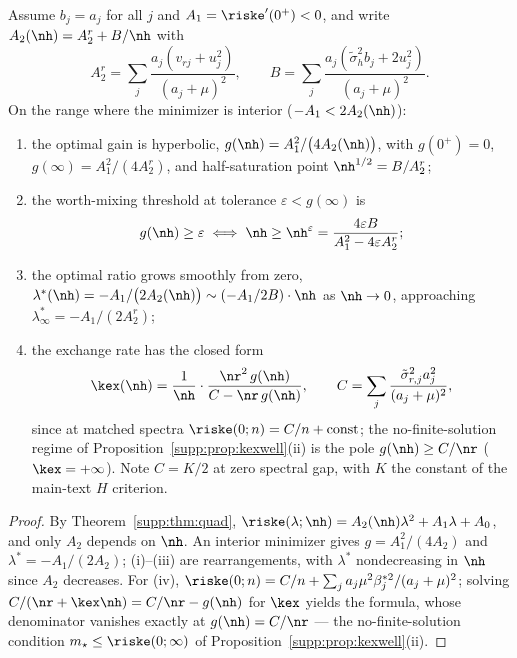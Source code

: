 \begin{theorem}\label{supp:thm:dosage}
Assume $b_j = a_j$ for all $j$ and $A_1 = \riske'(0^+) < 0$, and write $A_2(\nh) = A_2^r + B/\nh$ with
\begin{equation}
A_2^r = \sum_j \frac{a_j (v_{rj} + u_j^2)}{(a_j+\mu)^2},
\qquad
B = \sum_j \frac{a_j (\tilde\sigma_h^2 b_j + 2u_j^2)}{(a_j+\mu)^2}.
\end{equation}
On the range where the minimizer is interior ($-A_1 < 2A_2(\nh)$):
\begin{enumerate}
\item[(i)] the optimal gain is hyperbolic,
$g(\nh) = A_1^2 / \big(4A_2(\nh)\big)$, with $g(0^+) = 0$, $g(\infty) = A_1^2/(4A_2^r)$, and half-saturation point $\nh^{1/2} = B/A_2^r$;
\item[(ii)] the worth-mixing threshold at tolerance $\varepsilon < g(\infty)$ is
\begin{equation}
g(\nh) \ge \varepsilon \iff \nh \ge \nh^\varepsilon = \frac{4\varepsilon B}{A_1^2 - 4\varepsilon A_2^r};
\end{equation}
\item[(iii)] the optimal ratio grows smoothly from zero,
$\lambda^*(\nh) = -A_1/\big(2A_2(\nh)\big) \sim (-A_1/2B)\cdot\nh$ as $\nh \to 0$, approaching $\lambda^*_\infty = -A_1/(2A_2^r)$;
\item[(iv)] the exchange rate has the closed form
\begin{equation}
\kex(\nh) = \frac{1}{\nh}\cdot \frac{\nr^2\, g(\nh)}{C - \nr\, g(\nh)},
\qquad
C = \sum_j \frac{\tilde\sigma_{r,j}^2 a_j^2}{(a_j+\mu)^2},
\end{equation}
since at matched spectra $\riske(0; n) = C/n + \mathrm{const}$; the no-finite-solution regime of Proposition~\ref{supp:prop:kexwell}(ii) is the pole $g(\nh) \ge C/\nr$ ($\kex = +\infty$).
Note $C = K/2$ at zero spectral gap, with $K$ the constant of the main-text $H$ criterion.
\end{enumerate}
\end{theorem}

\begin{proof}
By Theorem~\ref{supp:thm:quad}, $\riske(\lambda; \nh) = A_2(\nh)\lambda^2 + A_1\lambda + A_0$, and only $A_2$ depends on $\nh$.
An interior minimizer gives $g = A_1^2/(4A_2)$ and $\lambda^* = -A_1/(2A_2)$; (i)--(iii) are rearrangements, with $\lambda^*$ nondecreasing in $\nh$ since $A_2$ decreases.
For (iv), $\riske(0; n) = C/n + \sum_j a_j \mu^2\beta_j^{*2}/(a_j+\mu)^2$; solving $C/(\nr + \kex\nh) = C/\nr - g(\nh)$ for $\kex$ yields the formula, whose denominator vanishes exactly at $g(\nh) = C/\nr$ --- the no-finite-solution condition $m_\star \le \riske(0;\infty)$ of Proposition~\ref{supp:prop:kexwell}(ii).
\end{proof}

